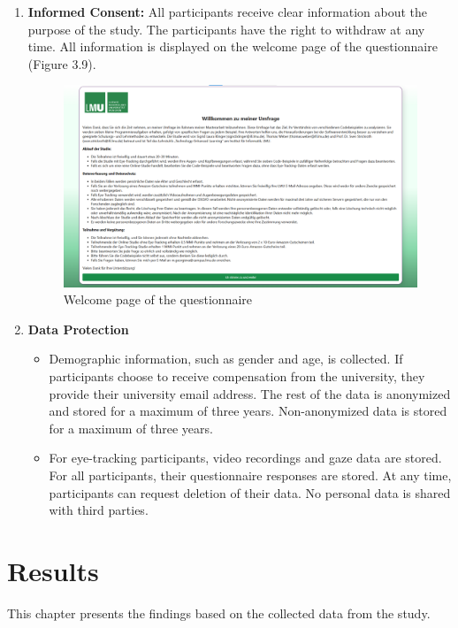 \begin{enumerate}
    \item \textbf{Informed Consent: }All participants receive clear information about the purpose of the study. The participants have the right to withdraw at any time. All information is displayed on the welcome page of the questionnaire (Figure 3.9).

\begin{figure} [H]
  \centering
  \includegraphics[scale=0.45]{figures/welcome_page.png}
  \caption{Welcome page of the questionnaire }
  \label{fig:AnhangsChor}
\end{figure}

    
    \item \textbf{Data Protection}
    \begin{itemize}
        \item Demographic information, such as gender and age, is collected. If participants choose to receive compensation from the university, they provide their university email address. The rest of the data is anonymized and stored for a maximum of three years. Non-anonymized data is stored for a maximum of three years.
        \item  For eye-tracking participants, video recordings and gaze data are stored. For all participants, their questionnaire responses are stored. At any time, participants can request deletion of their data. No personal data is shared with third parties.
    \end{itemize}
\end{enumerate}

\chapter{Results}
This chapter presents the findings based on the collected data from the study. 

